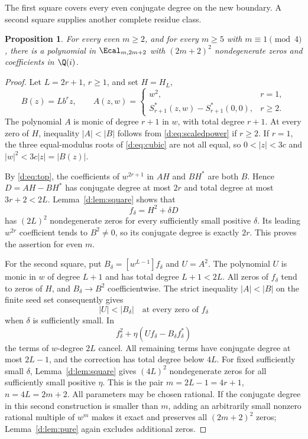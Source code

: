 \documentclass[UTF8,11pt]{ctexart}
\newtheorem{prop}[thm]{Proposition}
\theoremstyle{definition}
\numberwithin{equation}{section}
\begin{document}
The first square covers every even conjugate degree on the new boundary.
A second square supplies another complete residue class.
\begin{prop}\label{d:prop:two}
For every even $m\ge2$, and for every $m\ge5$ with $m\equiv1\pmod4$,
there is a polynomial in $\Ecal_{m,2m+2}$ with $(2m+2)^2$
nondegenerate zeros and coefficients in $\Q(i)$.
\end{prop}
\begin{proof}
Let $L=2r+1$, $r\ge1$, and set $H=H_L$,
\[
 B(z)=Lb^rz,\qquad
 A(z,w)=\begin{cases}
 w^2,&r=1,\\
 S_{r+1}^*(z,w)-S_{r+1}^*(0,0),&r\ge2.
 \end{cases}
\]
The polynomial $A$ is monic of degree $r+1$ in $w$, with total degree
$r+1$. At every zero of $H$, inequality $|A|<|B|$ follows from
\eqref{d:eq:scaledpower} if $r\ge2$. If $r=1$, the three equal-modulus
roots of \eqref{d:eq:cubic} are not all equal, so $0<|z|<3c$ and
$|w|^2<3c|z|=|B(z)|$.

By \eqref{d:eq:top}, the coefficients of $w^{2r+1}$ in $AH$ and $BH^*$
are both $B$. Hence $D=AH-BH^*$ has conjugate degree at most $2r$ and
total degree at most $3r+2<2L$. Lemma~\ref{d:lem:square} shows that
\[
 f_\delta=H^2+\delta D
\]
has $(2L)^2$ nondegenerate zeros for every sufficiently small positive
$\delta$. Its leading $w^{2r}$ coefficient tends to $B^2\ne0$, so its
conjugate degree is exactly $2r$. This proves the assertion for even $m$.

For the second square, put $B_\delta=[w^{L-1}]f_\delta$ and $U=A^2$.
The polynomial $U$ is monic in $w$ of degree $L+1$ and has total degree
$L+1<2L$. All zeros of $f_\delta$ tend to zeros of $H$, and
$B_\delta\to B^2$ coefficientwise. The strict inequality $|A|<|B|$ on
the finite seed set consequently gives
\[
 |U|<|B_\delta|\quad\text{at every zero of }f_\delta
\]
when $\delta$ is sufficiently small. In
\[
 f_\delta^2+\eta(Uf_\delta-B_\delta f_\delta^*)
\]
the terms of $w$-degree $2L$ cancel. All remaining terms have conjugate
degree at most $2L-1$, and the correction has total degree below $4L$.
For fixed sufficiently small $\delta$, Lemma~\ref{d:lem:square} gives
$(4L)^2$ nondegenerate zeros for all sufficiently small positive $\eta$.
This is the pair $m=2L-1=4r+1$, $n=4L=2m+2$.
All parameters may be chosen rational. If the conjugate degree in this
second construction is smaller than $m$, adding an arbitrarily small
nonzero rational multiple of $w^m$ makes it exact and preserves all
$(2m+2)^2$ zeros; Lemma~\ref{d:lem:pure} again excludes additional zeros.
\end{proof}
\end{document}
